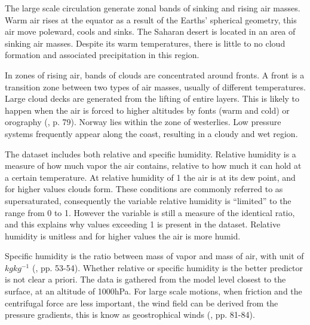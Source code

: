 The large scale circulation generate zonal bands of sinking and rising air masses. Warm air rises at the equator as a result of the Earths' spherical geometry, this air move poleward, cools and sinks. The Saharan desert is located in an area of sinking air masses. Despite its warm temperatures, there is little to no cloud formation and associated precipitation in this region. 

In zones of rising air, bands of clouds are concentrated around fronts. A front is a transition zone between two types of air masses, usually of different temperatures. %
Large cloud decks are generated from the lifting of entire layers. This is likely to happen when the air is forced to higher altitudes by fonts (warm and cold) or orography (\cite{lohmann2016}, p. 79). Norway lies within the zone of westerlies. Low pressure systems frequently appear along the coast, resulting in a cloudy and wet region. 

The dataset includes both relative and specific humidity. Relative humidity is a measure of how much vapor the air contains, relative to how much it can hold at a certain temperature. At relative humidity of 1 the air is at its dew point, and for higher values clouds form. These conditions are commonly referred to as supersaturated, consequently the variable relative humidity is ``limited'' to the range from 0 to 1. 
However the variable is still a measure of the identical ratio, and this explains why values exceeding 1 is present in the dataset. Relative humidity is unitless and for higher values the air is more humid.

Specific humidity is the ratio between mass of vapor and mass of air, with unit of $kg kg^{-1}$ (\cite{lohmann2016}, pp. 53-54). Whether relative or specific humidity is the better predictor is not clear a priori. The data is gathered from the model level closest to the surface, at an altitude of 1000hPa. For large scale motions, when friction and the centrifugal force are less important, the wind field can be derived from the pressure gradients, this is know as geostrophical winds  (\cite{lohmann2016}, pp. 81-84).

